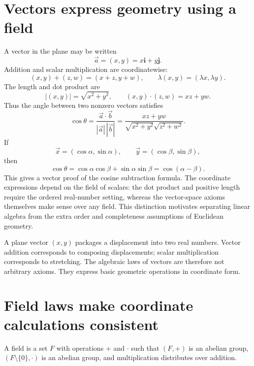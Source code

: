 
\section{Vectors express geometry using a field}

A vector in the plane may be written
\[
  \vec a=(x,y)=x\mathbf i+y\mathbf j.
\]
Addition and scalar multiplication are coordinatewise:
\[
  (x,y)+(z,w)=(x+z,y+w),\qquad
  \lambda(x,y)=(\lambda x,\lambda y).
\]
The length and dot product are
\[
  |(x,y)|=\sqrt{x^2+y^2},\qquad
  (x,y)\cdot(z,w)=xz+yw.
\]
Thus the angle between two nonzero vectors satisfies
\[
  \cos\theta=\frac{\vec a\cdot\vec b}{|\vec a|\,|\vec b|}
  =\frac{xz+yw}{\sqrt{x^2+y^2}\sqrt{z^2+w^2}}.
\]
If
\[
  \vec x=(\cos\alpha,\sin\alpha),\qquad
  \vec y=(\cos\beta,\sin\beta),
\]
then
\[
  \cos\theta=\cos\alpha\cos\beta+\sin\alpha\sin\beta
  =\cos(\alpha-\beta).
\]
This gives a vector proof of the cosine subtraction formula. The coordinate expressions depend on the field of scalars: the dot product and positive length require the ordered real-number setting, whereas the vector-space axioms themselves make sense over any field. This distinction motivates separating linear algebra from the extra order and completeness assumptions of Euclidean geometry.

A plane vector \((x,y)\) packages a displacement into two real numbers.  Vector addition corresponds to composing displacements; scalar multiplication corresponds to stretching.  The algebraic laws of vectors are therefore not arbitrary axioms.  They express basic geometric operations in coordinate form.

\section{Field laws make coordinate calculations consistent}

\begin{axiom}
A field is a set \(F\) with operations \(+\) and \(\cdot\) such that \((F,+)\) is an abelian group, \((F\setminus\{0\},\cdot)\) is an abelian group, and multiplication distributes over addition.
\end{axiom}


